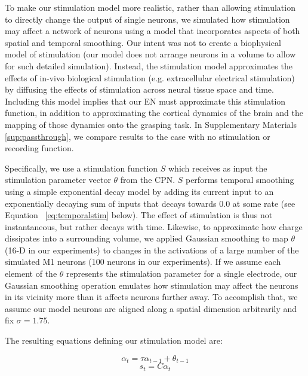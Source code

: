 \documentclass[12pt]{iopart}
\begin{document}
To make our stimulation model more realistic, rather than allowing stimulation to directly change the
output of single neurons, we simulated how stimulation may affect a network of neurons using a
model that incorporates aspects of both spatial and temporal smoothing. Our intent was not to create a
biophysical model of stimulation (our model does not arrange neurons in a volume to allow for such detailed
simulation). Instead, the stimulation model approximates the effects of in-vivo biological stimulation (e.g.
extracellular electrical stimulation) by diffusing the effects of stimulation across neural tissue space and time.
Including this model implies that our EN must approximate this stimulation function, in addition to approximating
the cortical dynamics of the brain and the mapping of those dynamics onto the grasping task. In Supplementary Materials
\ref{sup:passthrough}, we compare results to the case with no stimulation or recording function.

Specifically, we use a stimulation function $S$ which receives as input the stimulation parameter vector $\theta$
from the CPN. $S$ performs temporal smoothing using a simple exponential decay model by adding its current input to
an exponentially decaying sum of inputs that decays towards $0.0$ at some rate (see Equation ~\ref{eq:temporalstim} below).
The effect of stimulation is thus not instantaneous, but rather decays with time. Likewise, to approximate how charge
dissipates into a surrounding volume, we applied Gaussian smoothing to map $\theta$ (16-D in our experiments) to changes
in the activations of a large number of the simulated M1 neurons (100 neurons in our experiments). If we assume each element
of the $\theta$ represents the stimulation parameter for a single electrode, our Gaussian smoothing operation emulates how
stimulation may affect the neurons in its vicinity more than it affects neurons further away. To accomplish that, we assume
our model neurons are aligned along a spatial dimension arbitrarily and fix $\sigma=1.75$. 

The resulting equations defining our stimulation model are:

\begin{equation}
\alpha_{t} = \tau\alpha_{t-1} + \theta_{t-1} \label{eq:temporalstim}
\end{equation}
\begin{equation}
s_{t} = C\alpha_{t}
\end{equation}
\end{document}
